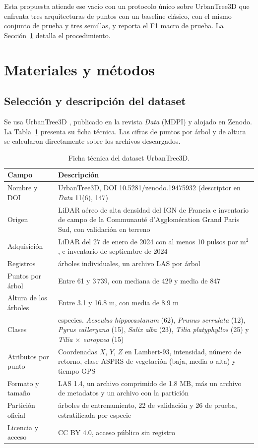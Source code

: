 \documentclass[preprint,12pt]{elsarticle}
\begin{document}
Esta propuesta atiende ese vacío con un protocolo único sobre UrbanTree3D que enfrenta tres arquitecturas de puntos con un baseline clásico, con el mismo conjunto de prueba y tres semillas, y reporta el F1 macro de prueba. La Sección~\ref{sec:metodos} detalla el procedimiento.

\section{Materiales y métodos}
\label{sec:metodos}

\subsection{Selección y descripción del dataset}
\label{sec:dataset}

Se usa UrbanTree3D \cite{hamdani2026urbantree3d,hamdani2026zenodo}, publicado en la revista \textit{Data} (MDPI) y alojado en Zenodo. La Tabla~\ref{tab:ficha} presenta su ficha técnica. Las cifras de puntos por árbol y de altura se calcularon directamente sobre los archivos descargados.

\begin{table}[h]
\centering
\small
\begin{tabular}{>{\raggedright\arraybackslash}p{3.6cm} >{\raggedright\arraybackslash}p{10.2cm}}
\toprule
Campo & Descripción \\
\midrule
Nombre y DOI & UrbanTree3D, DOI 10.5281/zenodo.19475932 (descriptor en \textit{Data} 11(6), 147) \\
Origen & LiDAR aéreo de alta densidad del IGN de Francia e inventario de campo de la Communauté d'Agglomération Grand Paris Sud, con validación en terreno \\
Adquisición & LiDAR del 27 de enero de 2024 con al menos 10 pulsos por m$^2$, e inventario de septiembre de 2024 \\
Registros & 152 árboles individuales, un archivo LAS por árbol \\
Puntos por árbol & Entre 61 y 3\,739, con mediana de 429 y media de 847 \\
Altura de los árboles & Entre 3.1 y 16.8 m, con media de 8.9 m \\
Clases & 6 especies. \textit{Aesculus hippocastanum} (62), \textit{Prunus serrulata} (12), \textit{Pyrus calleryana} (15), \textit{Salix alba} (23), \textit{Tilia platyphyllos} (25) y \textit{Tilia $\times$ europaea} (15) \\
Atributos por punto & Coordenadas $X$, $Y$, $Z$ en Lambert-93, intensidad, número de retorno, clase ASPRS de vegetación (baja, media o alta) y tiempo GPS \\
Formato y tamaño & LAS 1.4, un archivo comprimido de 1.8 MB, más un archivo de metadatos y un archivo con la partición \\
Partición oficial & 104 árboles de entrenamiento, 22 de validación y 26 de prueba, estratificada por especie \\
Licencia y acceso & CC BY 4.0, acceso público sin registro \\
\bottomrule
\end{tabular}
\caption{Ficha técnica del dataset UrbanTree3D.}
\label{tab:ficha}
\end{table}
\end{document}
